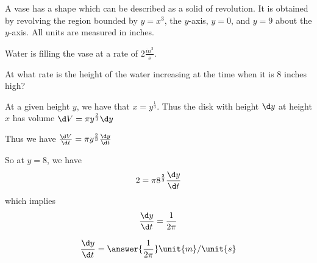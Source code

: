 \documentclass{ximera}
\author{Steven Gubkin}
\begin{document}
\begin{exercise}

A vase has a shape which can be described as a solid of revolution.
It is obtained by revolving the region bounded by $y=x^3$, the
$y$-axis, $y=0$, and $y=9$ about the $y$-axis.  All units are measured in inches.

Water is filling the vase at a rate of $2
\frac{\unit{in}^3}{\unit{s}}$.

At what rate is the height of the water increasing at the time when it
is $8$ inches high?

\begin{hint}
  At a given height $y$, we have that $x = y^{\frac{1}{3}}$.  Thus the
  disk with height $\d y$ at height $x$ has volume $\d V = \pi
  y^{\frac{2}{3}} \d y$
\end{hint}

\begin{hint}
  Thus we have $\frac{\d V}{\d t} = \pi y^{\frac{2}{3}} \frac{\d y}{\d
    t}$
\end{hint}

\begin{hint}
  So at $y=8$, we have	
  \[
  2 = \pi 8^\frac{2}{3} \frac{\d y}{\d t}
  \]
  which implies
  \[
  \frac{\d y}{\d t} = \frac{1}{2\pi}
  \]
\end{hint}
\begin{prompt}
  \[
  \frac{\d y}{\d t} = \answer{\frac{1}{2\pi}} \unit{m}/\unit{s}
  \]
\end{prompt}
\end{exercise}
\end{document}

